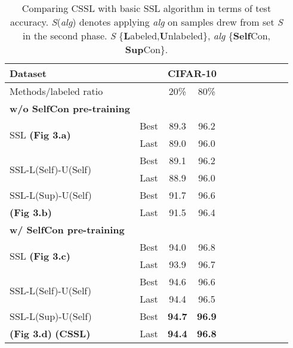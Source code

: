 \documentclass[letterpaper]{article} \usepackage{aaai22}  \usepackage{times}  \usepackage{helvet}  \usepackage{courier}  \usepackage[hyphens]{url}  \usepackage{graphicx} \usepackage{subfigure}
\begin{document}
\begin{table}[h]
\begin{center}
\begin{tabular}{lcccccccccc}
\hline
Dataset & & \multicolumn{2}{c}{CIFAR-10} \\
\hline
Methods/labeled ratio & & 20\% & 80\%  \\
\hline
\textbf{w/o SelfCon pre-training} \\
\hline
\multirow{2}{*}{SSL \textbf{(Fig 3.a)}} & Best & 89.3 & 96.2 \\
& Last & 89.0 & 96.0 \\
\hline
\multirow{2}{*}{SSL-L(Self)-U(Self)} & Best & 89.1 & 96.2 \\
& Last & 88.9 & 96.0 \\
\hline
SSL-L(Sup)-U(Self) & Best & 91.7 & 96.6 \\
\textbf{(Fig 3.b)}& Last & 91.5 & 96.4 \\
\hline
\textbf{w/ SelfCon pre-training} \\
\hline
\multirow{2}{*}{SSL \textbf{(Fig 3.c)}} & Best & 94.0 & 96.8 \\
& Last & 93.9 & 96.7 \\
\hline
\multirow{2}{*}{SSL-L(Self)-U(Self)} & Best & 94.6 & 96.6 \\
& Last & 94.4 & 96.5 \\
\hline
SSL-L(Sup)-U(Self) & Best & \textbf{94.7} & \textbf{96.9} \\
\textbf{(Fig 3.d)} \textbf{(CSSL)}& Last & \textbf{94.4} & \textbf{96.8} \\
\hline
\end{tabular}
\end{center}
\caption{Comparing CSSL with basic SSL algorithm in terms of test accuracy. \textit{S}(\textit{alg}) denotes applying \textit{alg} on samples drew from set \textit{S} in the second phase. \textit{S} \{\textbf{L}abeled,\textbf{U}nlabeled\}, \textit{alg}  \{\textbf{Self}Con, \textbf{Sup}Con\}. }
\label{tab:table1}
\end{table}
\end{document}
